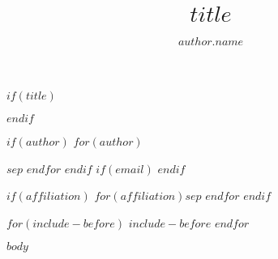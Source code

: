 \documentclass{aip-cp}
\begin{document}
$if(title)$
\title{$title$}
$endif$

$if(author)$
$for(author)$\author[$for(author.aff)$aff$author.aff$$sep$,$endfor$]{$author.name$}$sep$
$endfor$ %
$endif$
$if(email)$
$endif$

$if(affiliation)$
$for(affiliation)$$sep$
$endfor$
$endif$

\maketitle


$for(include-before)$
$include-before$
$endfor$

$body$
\end{document}
